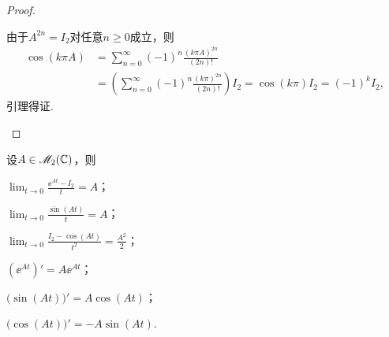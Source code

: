 \begin{proof}
\begin{inparaenum}[(a)]
    \item 由于$A^{2n}=I_2$对任意$n\ge0$成立，则
    \begin{align*}
      \cos(k\pi A) & = \sum_{n=0}^\infty (-1)^n\frac{(k\pi A)^{2n}}{(2n)!} \\
      & = \left( \sum_{n=0}^\infty(-1)^n \frac{(k\pi)^{2n}}{(2n)!} \right) I_2 = \cos(k\pi) I_2 = (-1)^kI_2,
    \end{align*}
    引理得证.
  \end{inparaenum}
\end{proof}

\begin{mybox}
  \begin{lemma}[极限与导数.]
    设$A\in\mathscr M_2(\mathbb C)$，则
    \begin{enum}
      \item\label{lemma4.3a} $\lim_{t\to0}\frac{\ee^{At}-I_2}t=A$；
      \item\label{lemma4.3b} $\lim_{t\to0}\frac{\sin(At)}t=A$；
      \item\label{lemma4.3c} $\lim_{t\to0}\frac{I_2-\cos(At)}{t^2}=
          \frac{A^2}2$；
      \item\label{lemma4.3d} $(\ee^{At})'=A\ee^{At}$；
      \item\label{lemma4.3e} $\big(\sin(At)\big)'=A\cos(At)$；
      \item\label{lemma4.3f} $\big(\cos(At)\big)'=-A\sin(At)$.
    \end{enum}
  \end{lemma}
\end{mybox}

